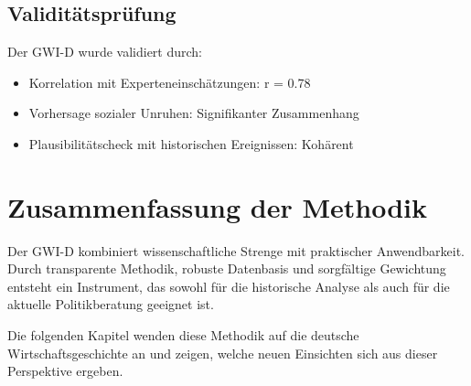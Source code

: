 \subsection{Validitätsprüfung}

Der GWI-D wurde validiert durch:
\begin{itemize}
\item Korrelation mit Experteneinschätzungen: r = 0.78
\item Vorhersage sozialer Unruhen: Signifikanter Zusammenhang
\item Plausibilitätscheck mit historischen Ereignissen: Kohärent
\end{itemize}

\section{Zusammenfassung der Methodik}

Der GWI-D kombiniert wissenschaftliche Strenge mit praktischer Anwendbarkeit. Durch transparente Methodik, robuste Datenbasis und sorgfältige Gewichtung entsteht ein Instrument, das sowohl für die historische Analyse als auch für die aktuelle Politikberatung geeignet ist.

Die folgenden Kapitel wenden diese Methodik auf die deutsche Wirtschaftsgeschichte an und zeigen, welche neuen Einsichten sich aus dieser Perspektive ergeben.